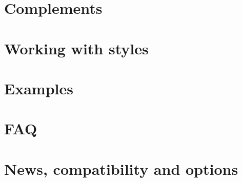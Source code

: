 \documentclass[DIV         = 14,
               fontsize    = 10pt,
               index       = totoc,
               twoside,
               cadre,
               headings    = small,
               ]{tkz-doc}
\begin{document}
\part{Complements}





\part{Working with styles}


\part{Examples}



\part{FAQ}


\part{News, compatibility and options}



\clearpage\newpage
\small\printindex
\end{document}
